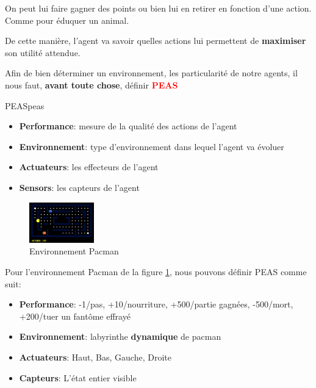 

\begin{example}\leavevmode
    On peut lui faire gagner des points ou bien lui en retirer en fonction d'une action. Comme pour éduquer un animal.
\end{example}
De cette manière, l'agent va savoir quelles actions lui permettent de \textbf{maximiser} son utilité attendue.

Afin de bien déterminer un environnement, les particularité de notre agents, il nous faut, 
\textbf{avant toute chose}, définir \textbf{\textcolor{red}{PEAS}}

\begin{definition}{PEAS}{peas}
    \begin{itemize}
        \item \textbf{Performance}: mesure de la qualité des actions de l'agent
        \item \textbf{Environnement}: type d'environnement dans lequel l'agent va évoluer
        \item \textbf{Actuateurs}: les effecteurs de l'agent
        \item \textbf{Sensors}: les capteurs de l'agent
    \end{itemize} 
\end{definition}

\begin{figure}[H]
    \begin{center}
        \includegraphics[width=0.25\textwidth]{./pictures/pacman.png}
    \end{center}
    \caption{Environnement Pacman}\label{fig:pacman}
\end{figure}

\begin{example}\leavevmode
    Pour l'environnement Pacman de la figure \ref{fig:pacman}, nous pouvons définir PEAS comme suit:
    \begin{itemize}
        \item \textbf{Performance}: -1/pas, +10/nourriture, +500/partie gagnées, -500/mort, +200/tuer un fantôme effrayé
        \item \textbf{Environnement}: labyrinthe \textbf{dynamique }de pacman
        \item \textbf{Actuateurs}: Haut, Bas, Gauche, Droite
        \item \textbf{Capteurs}: L'état entier visible
    \end{itemize}
\end{example}


